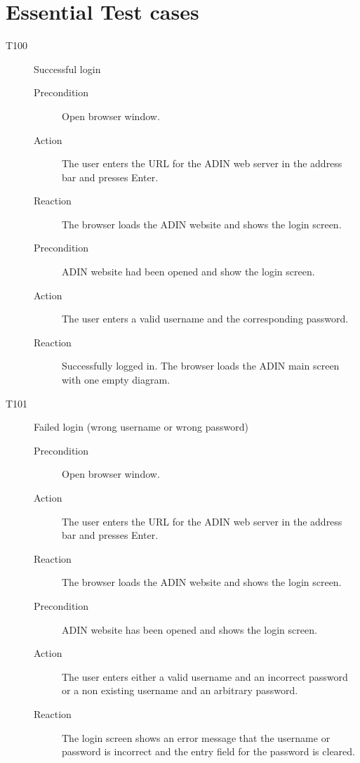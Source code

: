 \documentclass[twoside, english, draft]{Pflichtenheft}
\begin{document}
\section{Essential Test cases}

\begin{description}

  \item[T100] Successful login
\begin{description}
    \item[Precondition]
    Open browser window.
    \item[Action]
    The user enters the URL for the ADIN web server in the address bar and presses Enter.
    \item[Reaction]
    The browser loads the ADIN website and shows the login screen.

    \item[Precondition]
    ADIN website had been opened and show the login screen.
    \item[Action]
    The user enters a valid username and the corresponding password.
    \item[Reaction]
    Successfully logged in. The browser loads the ADIN main screen with one empty diagram.
\end{description}

  \item[T101] Failed login (wrong username or wrong password)
\begin{description}
    \item[Precondition]
    Open browser window.
    \item[Action]
    The user enters the URL for the ADIN web server in the address bar and presses Enter.
    \item[Reaction]
    The browser loads the ADIN website and shows the login screen.

    \item[Precondition]
    ADIN website has been opened and shows the login screen.
    \item[Action]
    The user enters either a valid username and an incorrect password or a non existing username and an arbitrary password.
    \item[Reaction]
    The login screen shows an error message that the username or password is incorrect and the entry field for the password is cleared.
\end{description}


\end{description}
\end{document}
